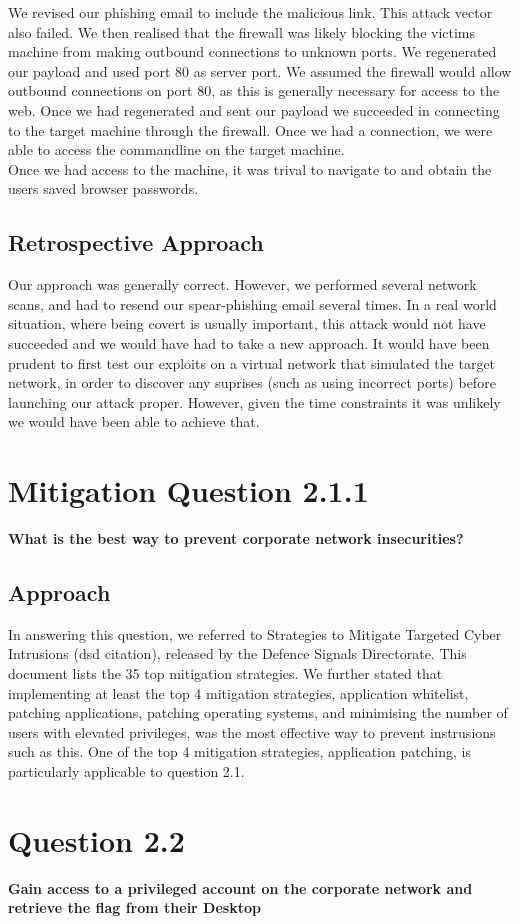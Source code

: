 We revised our phishing email to include the malicious link. This attack vector also failed. We then realised that the firewall was likely blocking the victims machine from making outbound connections to unknown ports. We regenerated our payload and used port 80 as server port. We assumed the firewall would allow outbound connections on port 80, as this is generally necessary for access to the web. Once we had regenerated and sent our payload we succeeded in connecting to the target machine through the firewall. Once we had a connection, we were able to access the commandline on the target machine.\\
Once we had access to the machine, it was trival to navigate to and obtain the users saved browser passwords.
\subsection{Retrospective Approach}
Our approach was generally correct. However, we performed several network scans, and had to resend our spear-phishing email several times. In a real world situation, where being covert is usually important, this attack would not have succeeded and we would have had to take a new approach. It would have been prudent to first test our exploits on a virtual network that simulated the target network, in order to discover any suprises (such as using incorrect ports) before launching our attack proper. However, given the time constraints it was unlikely we would have been able to achieve that. 
\section{Mitigation Question 2.1.1}
\textbf{What is the best way to prevent corporate network insecurities?}
\subsection{Approach}
In answering this question, we referred to Strategies to Mitigate Targeted Cyber Intrusions (dsd citation), released by the Defence Signals Directorate. This document lists the 35 top mitigation strategies. We further stated that implementing at least the top 4 mitigation strategies, application whitelist, patching applications, patching operating systems, and minimising the number of users with elevated privileges, was the most effective way to prevent instrusions such as this. One of the top 4 mitigation strategies, application patching, is particularly applicable to question 2.1. 
\section{Question 2.2}
\textbf{Gain access to a privileged account on the corporate network and
retrieve the flag from their Desktop}

